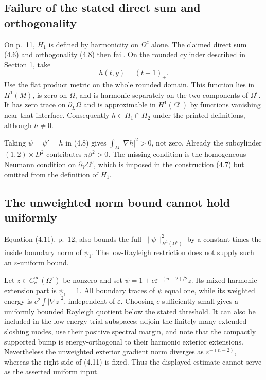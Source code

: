 \documentclass[10pt]{article}
\begin{document}
\subsection*{Failure of the stated direct sum and orthogonality}
On p. 11, \(H_1\) is defined by harmonicity on \(\Omega^c\) alone. The claimed direct sum (4.6) and orthogonality (4.8) then fail. On the rounded cylinder described in Section 1, take \[h(t,y)=(t-1)_+ .\] Use the flat product metric on the whole rounded domain. This function lies in \(H^1(M)\), is zero on \(\Omega\), and is harmonic separately on the two components of \(\Omega^c\). It has zero trace on \(\partial_L\Omega\) and is approximable in \(H^1(\Omega^c)\) by functions vanishing near that interface. Consequently \(h\in H_1\cap H_2\) under the printed definitions, although \(h\ne0\).\par
Taking \(\psi=\psi'=h\) in (4.8) gives \(\int_M|\nabla h|^2>0\), not zero. Already the subcylinder \((1,2)\times D^2\) contributes \(\pi\beta^2>0\). The missing condition is the homogeneous Neumann condition on \(\partial_V\Omega^c\), which is imposed in the construction (4.7) but omitted from the definition of \(H_1\).\par
\subsection*{The unweighted norm bound cannot hold uniformly}
Equation (4.11), p. 12, also bounds the full \(\|\psi\|_{H^1(\Omega^c)}^2\) by a constant times the inside boundary norm of \(\psi_1\). The low-Rayleigh restriction does not supply such an \(\varepsilon\)-uniform bound.\par
Let \(z\in C_c^\infty(\Omega^c)\) be nonzero and set \(\psi=1+c\varepsilon^{-(n-2)/2}z\). Its mixed harmonic extension part is \(\psi_1=1\). All boundary traces of \(\psi\) equal one, while its weighted energy is \(c^2\int|\nabla z|^2\), independent of \(\varepsilon\). Choosing \(c\) sufficiently small gives a uniformly bounded Rayleigh quotient below the stated threshold. It can also be included in the low-energy trial subspaces: adjoin the finitely many extended sloshing modes, use their positive spectral margin, and note that the compactly supported bump is energy-orthogonal to their harmonic exterior extensions. Nevertheless the unweighted exterior gradient norm diverges as \(\varepsilon^{-(n-2)}\), whereas the right side of (4.11) is fixed. Thus the displayed estimate cannot serve as the asserted uniform input.\par
\end{document}
